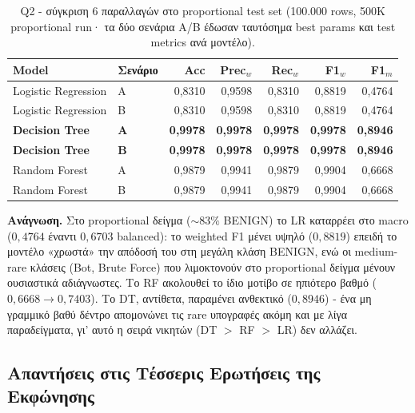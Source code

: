 \documentclass[12pt,a4paper,twoside]{book}
\begin{document}
\begin{table}[H]
    \centering
    \small
    \begin{tabular}{llrrrrr}
        \toprule
        \textbf{Model} & \textbf{Σενάριο} & \textbf{Acc} &
        \textbf{Prec\(_w\)} & \textbf{Rec\(_w\)} & \textbf{F1\(_w\)} &
        \textbf{F1\(_m\)} \\
        \midrule
        Logistic Regression & A & 0,8310 & 0,9598 & 0,8310 & 0,8819 & 0,4764 \\
        Logistic Regression & B & 0,8310 & 0,9598 & 0,8310 & 0,8819 & 0,4764 \\
        \textbf{Decision Tree} & \textbf{A} & \textbf{0,9978} & \textbf{0,9978} & \textbf{0,9978} & \textbf{0,9978} & \textbf{0,8946} \\
        \textbf{Decision Tree} & \textbf{B} & \textbf{0,9978} & \textbf{0,9978} & \textbf{0,9978} & \textbf{0,9978} & \textbf{0,8946} \\
        Random Forest       & A & 0,9879 & 0,9941 & 0,9879 & 0,9904 & 0,6668 \\
        Random Forest       & B & 0,9879 & 0,9941 & 0,9879 & 0,9904 & 0,6668 \\
        \bottomrule
    \end{tabular}
    \caption{Q2 - σύγκριση 6 παραλλαγών στο proportional test set
    (100.000 rows, 500K proportional run· τα δύο σενάρια A/B έδωσαν
    ταυτόσημα best params και test metrics ανά μοντέλο).}\label{tab:q2_comparison_prop}
\end{table}

\textbf{Ανάγνωση.} Στο proportional δείγμα (\(\sim 83\%\) BENIGN) το LR
καταρρέει στο macro (\(0{,}4764\) έναντι \(0{,}6703\) balanced): το weighted
F1 μένει υψηλό (\(0{,}8819\)) επειδή το μοντέλο «χρωστά» την απόδοσή του στη
μεγάλη κλάση BENIGN, ενώ οι medium-rare κλάσεις (Bot, Brute Force) που
λιμοκτονούν στο proportional δείγμα μένουν ουσιαστικά αδιάγνωστες. Το RF
ακολουθεί το ίδιο μοτίβο σε ηπιότερο βαθμό (\(0{,}6668 \to 0{,}7403\)). Το DT,
αντίθετα, παραμένει ανθεκτικό (\(0{,}8946\)) - ένα μη γραμμικό βαθύ δέντρο
απομονώνει τις rare υπογραφές ακόμη και με λίγα παραδείγματα, γι' αυτό η
σειρά νικητών (DT \(>\) RF \(>\) LR) δεν αλλάζει.

\subsection{Απαντήσεις στις Τέσσερις Ερωτήσεις της Εκφώνησης}
\end{document}
